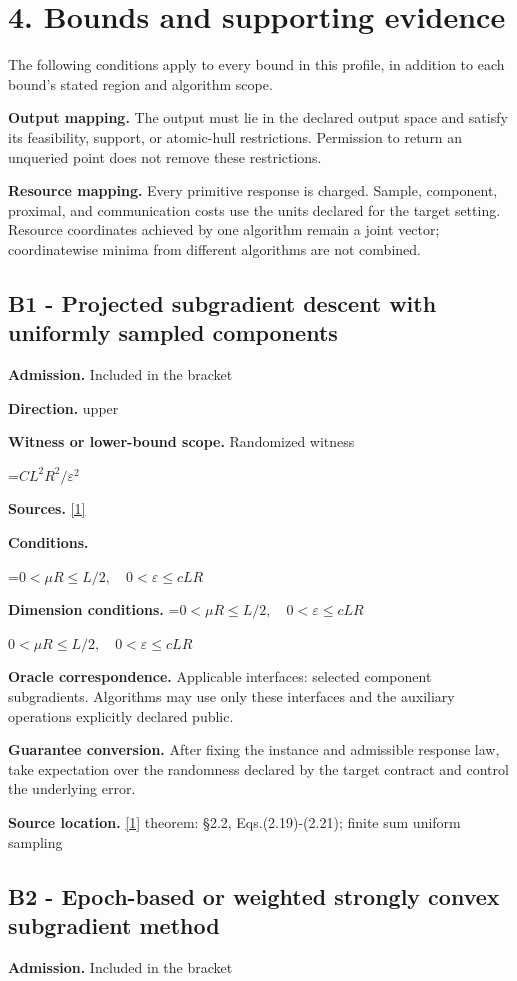 \documentclass[10pt,a4paper]{article}
\newcommand{\AtlasMath}[1]{\par\begingroup\centering\setbox0=\hbox{$\displaystyle #1$}\ifdim\wd0>1.4\linewidth\typeout{ATLAS WIDE FORMULA: \the\wd0}\fi\ifdim\wd0>\linewidth\resizebox{\linewidth}{!}{\box0}\else\box0\fi\par\endgroup}
\newcommand{\AtlasInlineMath}[1]{\begingroup\setbox0=\hbox{$#1$}\ifdim\wd0>.4\linewidth\endgroup\AtlasMath{#1}\else\endgroup$#1$\fi}
\begin{document}
\section{4. Bounds and supporting evidence}
The following conditions apply to every bound in this profile, in addition to each bound's stated region and algorithm scope.

\textbf{Output mapping.} The output must lie in the declared output space and satisfy its feasibility, support, or atomic-hull restrictions. Permission to return an unqueried point does not remove these restrictions.

\textbf{Resource mapping.} Every primitive response is charged. Sample, component, proximal, and communication costs use the units declared for the target setting. Resource coordinates achieved by one algorithm remain a joint vector; coordinatewise minima from different algorithms are not combined.

\subsection{B1 - Projected subgradient descent with uniformly sampled components}
\textbf{Admission.} Included in the bracket

\textbf{Direction.} upper

\textbf{Witness or lower-bound scope.} Randomized witness

\AtlasMath{CL^2R^2/\varepsilon^2}
\textbf{Sources.} \href{https://www2.isye.gatech.edu/~nemirovs/SIOPT_RSA_2009.pdf}{[1]}

\textbf{Conditions.} 
\AtlasMath{0<\mu R\le L/2,\quad0<\varepsilon\le cLR}


\textbf{Dimension conditions.} \AtlasInlineMath{0<\mu R\le L/2,\quad0<\varepsilon\le cLR}

\textbf{Oracle correspondence.} Applicable interfaces: selected component subgradients. Algorithms may use only these interfaces and the auxiliary operations explicitly declared public.

\textbf{Guarantee conversion.} After fixing the instance and admissible response law, take expectation over the randomness declared by the target contract and control the underlying error.

\textbf{Source location.} \href{https://www2.isye.gatech.edu/~nemirovs/SIOPT_RSA_2009.pdf}{[1]} theorem: §2.2, Eqs.(2.19)-(2.21); finite sum uniform sampling

\subsection{B2 - Epoch-based or weighted strongly convex subgradient method}
\textbf{Admission.} Included in the bracket
\end{document}
